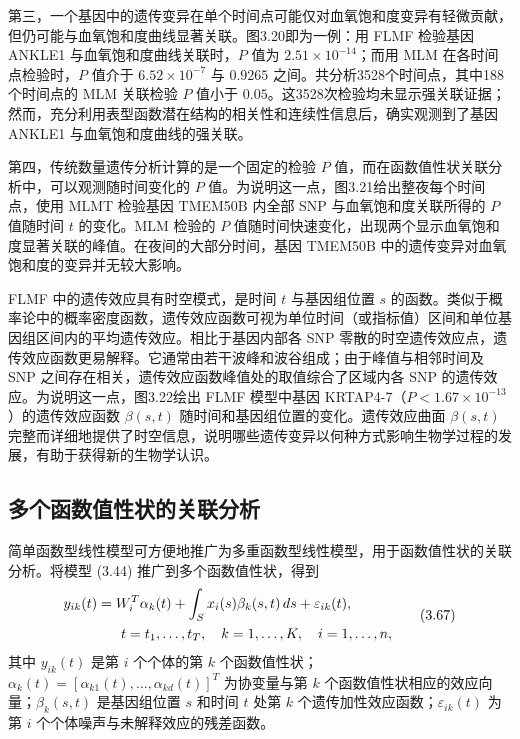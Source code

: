 

第三，一个基因中的遗传变异在单个时间点可能仅对血氧饱和度变异有轻微贡献，但仍可能与血氧饱和度曲线显著关联。图3.20即为一例：用 FLMF 检验基因 ANKLE1 与血氧饱和度曲线关联时，$P$ 值为 $2.51\times10^{-14}$；而用 MLM 在各时间点检验时，$P$ 值介于 $6.52\times10^{-7}$ 与 $0.9265$ 之间。共分析3528个时间点，其中188个时间点的 MLM 关联检验 $P$ 值小于 $0.05$。这3528次检验均未显示强关联证据；然而，充分利用表型函数潜在结构的相关性和连续性信息后，确实观测到了基因 ANKLE1 与血氧饱和度曲线的强关联。



第四，传统数量遗传分析计算的是一个固定的检验 $P$ 值，而在函数值性状关联分析中，可以观测随时间变化的 $P$ 值。为说明这一点，图3.21给出整夜每个时间点，使用 MLMT 检验基因 TMEM50B 内全部 SNP 与血氧饱和度关联所得的 $P$ 值随时间 $t$ 的变化。MLM 检验的 $P$ 值随时间快速变化，出现两个显示血氧饱和度显著关联的峰值。在夜间的大部分时间，基因 TMEM50B 中的遗传变异对血氧饱和度的变异并无较大影响。



FLMF 中的遗传效应具有时空模式，是时间 $t$ 与基因组位置 $s$ 的函数。类似于概率论中的概率密度函数，遗传效应函数可视为单位时间（或指标值）区间和单位基因组区间内的平均遗传效应。相比于基因内部各 SNP 零散的时空遗传效应点，遗传效应函数更易解释。它通常由若干波峰和波谷组成；由于峰值与相邻时间及 SNP 之间存在相关，遗传效应函数峰值处的取值综合了区域内各 SNP 的遗传效应。为说明这一点，图3.22绘出 FLMF 模型中基因 KRTAP4-7（$P<1.67\times10^{-13}$）的遗传效应函数 $\beta(s,t)$ 随时间和基因组位置的变化。遗传效应曲面 $\beta(s,t)$ 完整而详细地提供了时空信息，说明哪些遗传变异以何种方式影响生物学过程的发展，有助于获得新的生物学认识。


\FloatBarrier

\subsection{多个函数值性状的关联分析}

简单函数型线性模型可方便地推广为多重函数型线性模型，用于函数值性状的关联分析。将模型 (3.44) 推广到多个函数值性状，得到
\begin{equation}
\begin{aligned}
y_{ik}(t)&=W_i^T\alpha_k(t)+\int_Sx_i(s)\beta_k(s,t)\,ds+\varepsilon_{ik}(t),\\
&\hspace{.6cm}t=t_1,\ldots,t_T,\quad k=1,\ldots,K,\quad i=1,\ldots,n,
\end{aligned}
\tag{3.67}
\end{equation}
其中 $y_{ik}(t)$ 是第 $i$ 个个体的第 $k$ 个函数值性状；$\alpha_k(t)=[\alpha_{k1}(t),\ldots,\alpha_{kd}(t)]^T$ 为协变量与第 $k$ 个函数值性状相应的效应向量；$\beta_k(s,t)$ 是基因组位置 $s$ 和时间 $t$ 处第 $k$ 个遗传加性效应函数；$\varepsilon_{ik}(t)$ 为第 $i$ 个个体噪声与未解释效应的残差函数。

